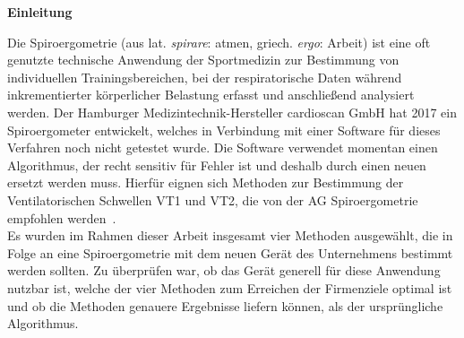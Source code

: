 \begin{center} \textbf{\Large Einleitung} \end{center}
Die Spiroergometrie (aus lat. \textsl{spirare}: atmen, griech. \textsl{ergo}: Arbeit) ist eine oft genutzte technische Anwendung der Sportmedizin zur Bestimmung von individuellen Trainingsbereichen, bei der respiratorische Daten während inkrementierter körperlicher Belastung erfasst und anschließend analysiert werden. Der Hamburger Medizintechnik-Hersteller cardioscan GmbH hat 2017 ein Spiroergometer entwickelt, welches in Verbindung mit einer Software für dieses Verfahren noch nicht getestet wurde. Die Software verwendet momentan einen Algorithmus, der recht sensitiv für Fehler ist und deshalb durch einen neuen ersetzt werden muss. Hierfür eignen sich Methoden zur Bestimmung der Ventilatorischen Schwellen VT1 und VT2, die von der AG Spiroergometrie empfohlen werden~\cite{Westhoff.2012}.\\
Es wurden im Rahmen dieser Arbeit insgesamt vier Methoden ausgewählt, die in Folge an eine Spiroergometrie mit dem neuen Gerät des Unternehmens bestimmt werden sollten. Zu überprüfen war, ob das Gerät generell für diese Anwendung nutzbar ist, welche der vier Methoden zum Erreichen der Firmenziele optimal ist und ob die Methoden genauere Ergebnisse liefern können, als der ursprüngliche Algorithmus.




